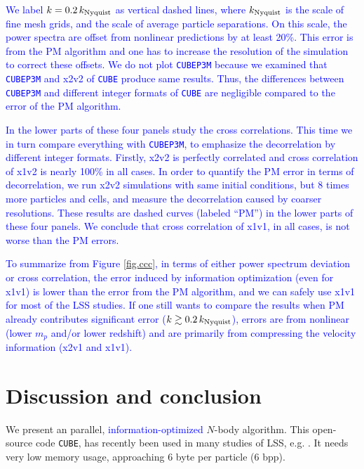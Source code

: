 \documentclass[10pt,twocolumn,preprint]{emulateapj}
\newcommand{\tcb}{\textcolor{blue}}
\begin{document}
\tcb{We label $k=0.2\,k_{\rm Nyquist}$ as vertical dashed lines, where $k_{\rm Nyquist}$ is the scale of fine mesh grids, and the scale of average particle separations. On this scale, the power spectra are offset from nonlinear predictions by at least 20\%. This error is from the PM algorithm and one has to increase the resolution of the simulation to correct these offsets. We do not plot {\tt CUBEP3M} because we examined that {\tt CUBEP3M} and x2v2 of {\tt CUBE} produce same results. Thus, the differences between {\tt CUBEP3M} and different integer formats of {\tt CUBE} are negligible compared to the error of the PM algorithm.}

\tcb{In the lower parts of these four panels study the cross correlations. This time we in turn compare everything with {\tt CUBEP3M}, to emphasize the decorrelation by different integer formats. Firstly, x2v2 is perfectly correlated and cross correlation of x1v2 is nearly 100\% in all cases. In order to quantify the PM error in terms of decorrelation, we run x2v2 simulations with same initial conditions, but 8 times more particles and cells, and measure the decorrelation caused by coarser resolutions. These results are dashed curves (labeled ``PM'') in the lower parts of these four panels. We conclude that cross correlation of x1v1, in all cases, is not worse than the PM errors.}

\tcb{To summarize from Figure \ref{fig.ccc}, in terms of either power spectrum deviation or cross correlation, the error induced by information optimization (even for x1v1) is lower than the error from the PM algorithm, and we can safely use x1v1 for most of the LSS studies. If one still wants to compare the results when PM already contributes significant error ($k\gtrsim 0.2\,k_{\rm Nyquist}$), errors are from nonlinear (lower $m_p$ and/or lower redshift) and are primarily from compressing the velocity information (x2v1 and x1v1).}


\section{Discussion and conclusion}\label{s.discussion}
We present an parallel, \tcb{information-optimized} $N$-body algorithm. This open-source code {\tt CUBE}, has recently been used in many studies of LSS, e.g. \cite{2017PhRvD..95d3501Y,2017ApJ...841L..29W,2017MNRAS.469.1968P}. It needs very low memory usage, approaching 6 byte per particle (6 bpp).
\end{document}
